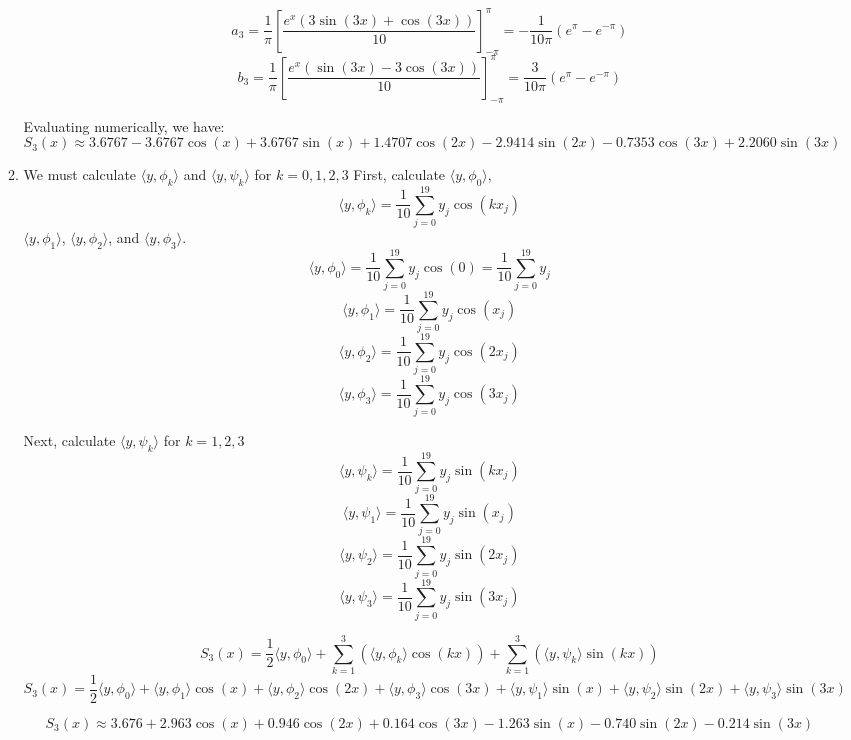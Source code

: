 \documentclass[12pt]{article}
\begin{document}
\begin{enumerate}[leftmargin=0em]
\begin{enumerate}[leftmargin=!]
        \[a_3 = \frac{1}{\pi} \left[ \frac{e^x (3 \sin(3x) + \cos(3x))}{10} \right]_{-\pi}^{\pi}= -\frac{1}{10\pi}(e^{\pi} - e^{-\pi})\]
        \[b_3 = \frac{1}{\pi} \left[ \frac{e^x (\sin(3x) - 3 \cos(3x))}{10} \right]_{-\pi}^{\pi}= \frac{3}{10\pi}(e^{\pi} - e^{-\pi})\]

        Evaluating numerically, we have:
        \[S_3(x) \approx 3.6767 - 3.6767\cos(x) + 3.6767\sin(x) + 1.4707\cos(2x) - 2.9414\sin(2x) - 0.7353\cos(3x) + 2.2060\sin(3x)\]

        \item
        We must calculate \(\langle y,\phi _{k}\rangle \) and \(\langle y,\psi _{k}\rangle \) for \(k=0,1,2,3\) 
        First, calculate \(\langle y,\phi _{0}\rangle \),
        \[\langle y,\phi _{k}\rangle =\frac{1}{10}\sum _{j=0}^{19}y_{j}\cos (kx_{j})\]
        \(\langle y,\phi _{1}\rangle \), \(\langle y,\phi _{2}\rangle \), and \(\langle y,\phi _{3}\rangle \).
        \[\langle y,\phi _{0}\rangle =\frac{1}{10}\sum _{j=0}^{19}y_{j}\cos (0)=\frac{1}{10}\sum _{j=0}^{19}y_{j}\]
        \[\langle y,\phi _{1}\rangle =\frac{1}{10}\sum _{j=0}^{19}y_{j}\cos (x_{j})\]
        \[\langle y,\phi _{2}\rangle =\frac{1}{10}\sum _{j=0}^{19}y_{j}\cos (2x_{j})\]
        \[\langle y,\phi _{3}\rangle =\frac{1}{10}\sum _{j=0}^{19}y_{j}\cos (3x_{j})\]

        Next, calculate \(\langle y,\psi _{k}\rangle \) for \(k=1,2,3\)
        \[\langle y,\psi _{k}\rangle =\frac{1}{10}\sum _{j=0}^{19}y_{j}\sin (kx_{j})\]
        \[\langle y,\psi _{1}\rangle =\frac{1}{10}\sum _{j=0}^{19}y_{j}\sin (x_{j})\]
        \[\langle y,\psi _{2}\rangle =\frac{1}{10}\sum _{j=0}^{19}y_{j}\sin (2x_{j})\]
        \[\langle y,\psi _{3}\rangle =\frac{1}{10}\sum _{j=0}^{19}y_{j}\sin (3x_{j})\]

        \[S_{3}(x)=\frac{1}{2}\langle y,\phi _{0}\rangle +\sum _{k=1}^{3}(\langle y,\phi _{k}\rangle \cos (kx))+\sum _{k=1}^{3}(\langle y,\psi _{k}\rangle \sin (kx))\]
        \[S_{3}(x)=\frac{1}{2}\langle y,\phi _{0}\rangle +\langle y,\phi _{1}\rangle \cos (x)+\langle y,\phi _{2}\rangle \cos (2x)+\langle y,\phi _{3}\rangle \cos (3x)+\langle y,\psi _{1}\rangle \sin (x)+\langle y,\psi _{2}\rangle \sin (2x)+\langle y,\psi _{3}\rangle \sin (3x)\]
        
        \[S_{3}(x)\approx 3.676+2.963\cos (x)+0.946\cos (2x)+0.164\cos (3x)-1.263\sin (x)-0.740\sin (2x)-0.214\sin (3x)\]
        
    \end{enumerate} 


\end{enumerate}
\end{document}
